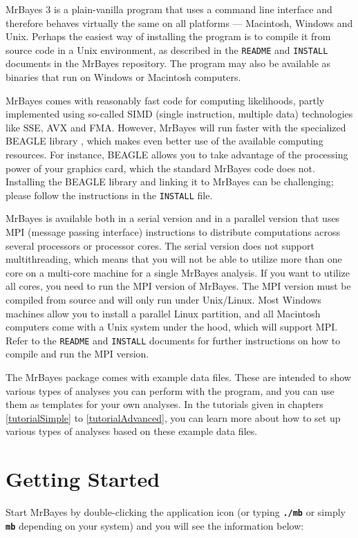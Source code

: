 \documentclass[12pt]{book}
\newcommand{\ttt}[1]{\texttt{#1}}
\newcommand{\tb}[1]{\ttt{\textbf{#1}}}
\begin{document}
MrBayes 3 is a plain-vanilla program that uses a command line interface and therefore behaves
virtually the same on all platforms --- Macintosh, Windows and Unix. Perhaps the easiest way of
installing the program is to compile it from source code in a Unix environment, as described in the
\ttt{README} and \ttt{INSTALL} documents in the MrBayes repository. The program may also be
available as binaries that run on Windows or Macintosh computers.

MrBayes comes with reasonably fast code for computing likelihoods, partly implemented using
so-called SIMD (single instruction, multiple data) technologies like SSE, AVX and FMA. However,
MrBayes will run faster with the specialized BEAGLE library \citep{ayres12}, which makes even
better use of the available computing resources. For instance, BEAGLE allows you to take advantage
of the processing power of your graphics card, which the standard MrBayes code does not. Installing
the BEAGLE library and linking it to MrBayes can be challenging; please follow the instructions in
the \ttt{INSTALL} file.

MrBayes is available both in a serial version and in a parallel version that uses MPI (message
passing interface) instructions to distribute computations across several processors or processor
cores. The serial version does not support multithreading, which means that you will not be able to
utilize more than one core on a multi-core machine for a single MrBayes analysis. If you want to
utilize all cores, you need to run the MPI version of MrBayes. The MPI version must be compiled
from source and will only run under Unix/Linux. Most Windows machines allow you to install a
parallel Linux partition, and all Macintosh computers come with a Unix system under the hood, which
will support MPI. Refer to the \ttt{README} and \ttt{INSTALL} documents for further instructions on
how to compile and run the MPI version.

The MrBayes package comes with example data files. These are intended to show various types of
analyses you can perform with the program, and you can use them as templates for your own analyses.
In the tutorials given in chapters \ref{tutorialSimple} to \ref{tutorialAdvanced}, you can learn
more about how to set up various types of analyses based on these example data files.

\section{Getting Started}
Start MrBayes by double-clicking the application icon (or typing \tb{./mb} or simply \tb{mb}
depending on your system) and you will see the information below:
\end{document}
